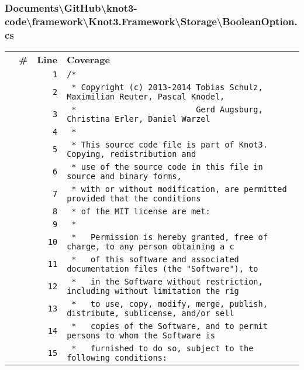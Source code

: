 \documentclass[a4paper,10pt]{article}
\begin{document}
\subsubsection{Documents\textbackslash GitHub\textbackslash knot3-code\textbackslash framework\textbackslash Knot3.Framework\textbackslash Storage\textbackslash BooleanOption.cs}
\begin{longtable}[l]{lrrl}
\textbf{} & \textbf{\#} & \textbf{Line} & \textbf{Coverage}\\
\cellcolor{gray} &  & \verb~1~ & \verb~/*~\\
\cellcolor{gray} &  & \verb~2~ & \verb~ * Copyright (c) 2013-2014 Tobias Schulz, Maximilian Reuter, Pascal Knodel,~\\
\cellcolor{gray} &  & \verb~3~ & \verb~ *                         Gerd Augsburg, Christina Erler, Daniel Warzel~\\
\cellcolor{gray} &  & \verb~4~ & \verb~ *~\\
\cellcolor{gray} &  & \verb~5~ & \verb~ * This source code file is part of Knot3. Copying, redistribution and~\\
\cellcolor{gray} &  & \verb~6~ & \verb~ * use of the source code in this file in source and binary forms,~\\
\cellcolor{gray} &  & \verb~7~ & \verb~ * with or without modification, are permitted provided that the conditions~\\
\cellcolor{gray} &  & \verb~8~ & \verb~ * of the MIT license are met:~\\
\cellcolor{gray} &  & \verb~9~ & \verb~ *~\\
\cellcolor{gray} &  & \verb~10~ & \verb~ *   Permission is hereby granted, free of charge, to any person obtaining a c~\\
\cellcolor{gray} &  & \verb~11~ & \verb~ *   of this software and associated documentation files (the "Software"), to ~\\
\cellcolor{gray} &  & \verb~12~ & \verb~ *   in the Software without restriction, including without limitation the rig~\\
\cellcolor{gray} &  & \verb~13~ & \verb~ *   to use, copy, modify, merge, publish, distribute, sublicense, and/or sell~\\
\cellcolor{gray} &  & \verb~14~ & \verb~ *   copies of the Software, and to permit persons to whom the Software is~\\
\cellcolor{gray} &  & \verb~15~ & \verb~ *   furnished to do so, subject to the following conditions:~\\

\end{longtable}
\end{document}
